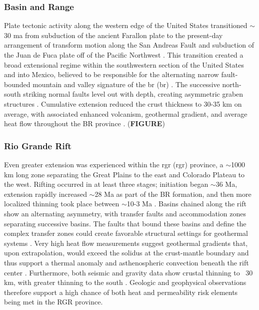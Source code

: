 \subsubsection{Basin and Range}

Plate tectonic activity along the western edge of the United States transitioned $\sim$30 \acrshort{ma} from subduction of the ancient Farallon plate to the present-day arrangement of transform motion along the San Andreas Fault and subduction of the Juan de Fuca plate off of the Pacific Northwest \citep[~p. 81]{fowler_solid_2005}. This transition created a broad extensional regime within the southwestern section of the United States and into Mexico, believed to be responsible for the alternating narrow fault-bounded mountain and valley signature of the \acrlong{br} (\acrshort{br}) \citep{henry_real_1992}. The successive north-south striking normal faults level out with depth, creating asymmetric graben structures \citep[~p. 28-29]{frisch_continental_2011}. Cumulative extension reduced the crust thickness to 30-35 km on average, with associated enhanced volcanism, geothermal gradient, and average heat flow throughout the BR province \citep{lerch_crustal_2007}. (\textbf{FIGURE})

\subsubsection{Rio Grande Rift}

Even greater extension was experienced within the \acrlong{rgr} (\acrshort{rgr}) province, a $\sim$1000 km long zone separating the Great Plains to the east and Colorado Plateau to the west. Rifting occurred in at least three stages; initiation began $\sim$36 Ma, extension rapidly increased $\sim$28 Ma as part of the BR formation, and then more localized thinning took place between $\sim$10-3 Ma \citep{bielicki_hydrogeolgic_2015,mack_geology_2008,seager_new_1984}. Basins chained along the rift show an alternating asymmetry, with transfer faults and accommodation zones separating successive basins. The faults that bound these basins and define the complex transfer zones could create favorable structural settings for geothermal systems \citep{faulds_favorable_2015}. Very high heat flow measurements suggest geothermal gradients that, upon extrapolation, would exceed the solidus at the crust-mantle boundary and thus support a thermal anomaly and asthenospheric convection beneath the rift center \citep{olsen_rio_1987}. Furthermore, both seismic and gravity data show crustal thinning to ~30 km, with greater thinning to the south \citep{keller_rio_1999}. Geologic and geophysical observations therefore support a high chance of both heat and permeability risk elements being met in the RGR province. 

